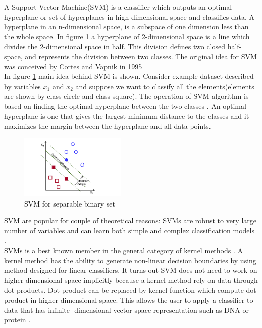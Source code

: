 A Support Vector Machine(SVM) is a classifier which outputs an optimal hyperplane or set of hyperplanes in high-dimensional space and classifies data. A hyperplane in an n-dimensional space, is a subspace of one dimension less than the whole space. In figure \ref{fig:SVM} a hyperplane of 2-dimensional space is a line which divides the 2-dimensional space in half. This division defines two closed half-space, and represents the division between two classes. The original idea for SVM was conceived by Cortes and Vapnik in 1995 \cite{cortes1995support} \\
In figure \ref{fig:SVM} main idea behind SVM is shown. Consider example dataset described by variables $x_1$ and $x_2$ and suppose we want to classify all the elements(elements are shown by class circle and class square). The operation of SVM algorithm is based on finding the optimal hyperplane between the two classes \cite{opencv_library}. An optimal hyperplane is one that gives the largest minimum distance to the classes and it maximizes the margin between the hyperplane and all data points. %

\begin{figure}[H]
    \includegraphics[width=0.45\textwidth]{./img/SVM.png}
     \caption{\footnotesize{SVM for separable binary set}}
    \label{fig:SVM}
\end{figure}

SVM are popular for couple of theoretical reasons: SVMs are robust to very large number of variables and can learn both simple and complex classification models \cite{cristianini2000}.\\

SVMs is a best known member in the general category of kernel methods \cite{shawe2004kernel}. A kernel method has the ability to generate non-linear decision boundaries by using method designed for linear classifiers. It turns out SVM does not need to work on higher-dimensional space implicitly because a kernel method rely on data through dot-products. Dot product can be replaced by kernel function which compute dot product in higher dimensional space. This allows the user to apply a classifier to data that has infinite- dimensional vector space representation such as DNA or protein \cite{ben2010user}.\\

